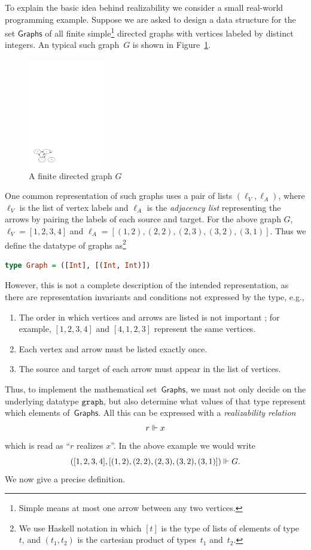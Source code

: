 To explain the basic idea behind realizability we consider a small
real-world programming example. Suppose we are asked to design a data
structure for the set $\mathsf{Graphs}$ of all finite
simple\footnote{Simple means at most one arrow between any two
  vertices.} directed graphs with vertices labeled by distinct
integers. An typical such graph~$G$ is shown in
Figure~\ref{fig:digraph}.
%
\begin{figure}[htp]
  \centering
  \includegraphics[width=0.3\textwidth]{digraph}
  \caption{A finite directed graph $G$}
  \label{fig:digraph}
\end{figure}
%
One common representation of such graphs uses a pair of lists
$(\ell_V, \ell_A)$, where $\ell_V$ is the list of vertex labels and
$\ell_A$ is the \emph{adjacency list} representing the arrows by
pairing the labels of each source and target. For the above graph $G$,
$\ell_V = [1, 2, 3, 4]$ and $\ell_A = [(1,2), (2,2), (2,3), (3,2),
(3,1)]$.
%
Thus we define the datatype of graphs as\footnote{We use Haskell
  notation in which $[t]$ is the type of lists of elements of
  type~$t$, and $(t_1, t_2)$ is the cartesian product of types~$t_1$
  and~$t_2$.}
%
\begin{lstlisting}[language=Haskell]
type Graph = ([Int], [(Int, Int)])
\end{lstlisting}
%
However, this is not a complete description of the intended
representation, as there are representation invariants and conditions
not expressed by the type, e.g.,
%
\begin{enumerate}
\item The order in which vertices and arrows are listed is not
  important%
; for example, $[1,2,3,4]$ and $[4,1,2,3]$ represent the same vertices.
\item Each vertex and arrow must be listed exactly once.
\item The source and target of each arrow must appear in the list of vertices.
\end{enumerate}
%
Thus, to implement the mathematical set~$\mathsf{Graphs}$, we must not
only decide on the underlying datatype $\mathtt{graph}$, but also
determine what values of that type represent which elements
of~$\mathsf{Graphs}$. All this can be expressed with a \emph{realizability
  relation}
%
\begin{equation*}
  r \Vdash x
\end{equation*}
%
which is read as ``$r$ realizes $x$''. In the above example we would
write
%
\begin{equation*}
([1, 2, 3, 4], [(1,2), (2,2), (2,3), (3,2), (3,1)]) \Vdash G.
\end{equation*}
%
We now give a precise definition.


